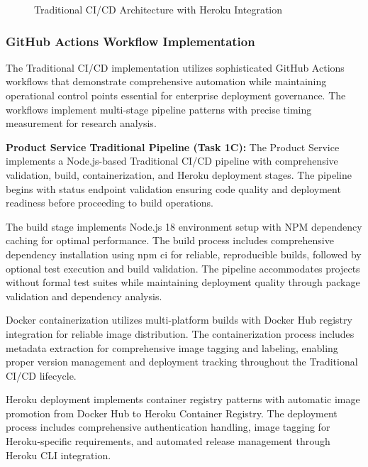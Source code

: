 \begin{figure}[H]
\centering
\caption{Traditional CI/CD Architecture with Heroku Integration}
\label{fig:traditional-cicd-architecture}
\end{figure}

\subsubsection{GitHub Actions Workflow Implementation}

The Traditional CI/CD implementation utilizes sophisticated GitHub Actions workflows that demonstrate comprehensive automation while maintaining operational control points essential for enterprise deployment governance. The workflows implement multi-stage pipeline patterns with precise timing measurement for research analysis.

\textbf{Product Service Traditional Pipeline (Task 1C):}
The Product Service implements a Node.js-based Traditional CI/CD pipeline with comprehensive validation, build, containerization, and Heroku deployment stages. The pipeline begins with status endpoint validation ensuring code quality and deployment readiness before proceeding to build operations.

The build stage implements Node.js 18 environment setup with NPM dependency caching for optimal performance. The build process includes comprehensive dependency installation using npm ci for reliable, reproducible builds, followed by optional test execution and build validation. The pipeline accommodates projects without formal test suites while maintaining deployment quality through package validation and dependency analysis.

Docker containerization utilizes multi-platform builds with Docker Hub registry integration for reliable image distribution. The containerization process includes metadata extraction for comprehensive image tagging and labeling, enabling proper version management and deployment tracking throughout the Traditional CI/CD lifecycle.

Heroku deployment implements container registry patterns with automatic image promotion from Docker Hub to Heroku Container Registry. The deployment process includes comprehensive authentication handling, image tagging for Heroku-specific requirements, and automated release management through Heroku CLI integration.

